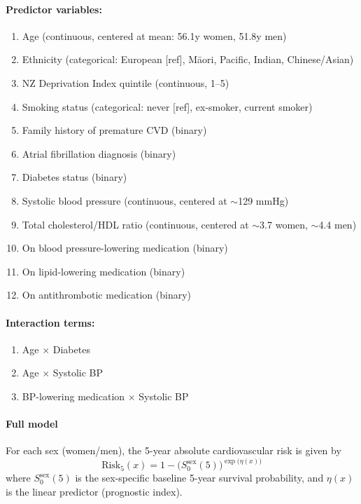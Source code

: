 \documentclass{article}
\begin{document}
\paragraph{Predictor variables:}
\begin{enumerate}
    \item Age (continuous, centered at mean: 56.1y women, 51.8y men)
    \item Ethnicity (categorical: European [ref], M\=aori, Pacific, Indian, Chinese/Asian)
    \item NZ Deprivation Index quintile (continuous, 1--5)
    \item Smoking status (categorical: never [ref], ex-smoker, current smoker)
    \item Family history of premature CVD (binary)
    \item Atrial fibrillation diagnosis (binary)
    \item Diabetes status (binary)
    \item Systolic blood pressure (continuous, centered at $\sim$129 mmHg)
    \item Total cholesterol/HDL ratio (continuous, centered at $\sim$3.7 women, $\sim$4.4 men)
    \item On blood pressure-lowering medication (binary)
    \item On lipid-lowering medication (binary)
    \item On antithrombotic medication (binary)
\end{enumerate}

\paragraph{Interaction terms:} 
\begin{enumerate}
    \item Age $\times$ Diabetes
    \item Age $\times$ Systolic BP
    \item BP-lowering medication $\times$ Systolic BP
\end{enumerate}

\paragraph{Full model}


For each sex (women/men), the 5-year absolute cardiovascular risk is given by
\begin{equation}
\text{Risk}_5(x)
=
1 - \bigl(S_0^{\text{sex}}(5)\bigr)^{\exp\bigl(\eta(x)\bigr)}
\end{equation}
where \(S_0^{\text{sex}}(5)\) is the sex-specific baseline 5-year survival
probability, and \(\eta(x)\) is the linear predictor (prognostic index).
\end{document}
